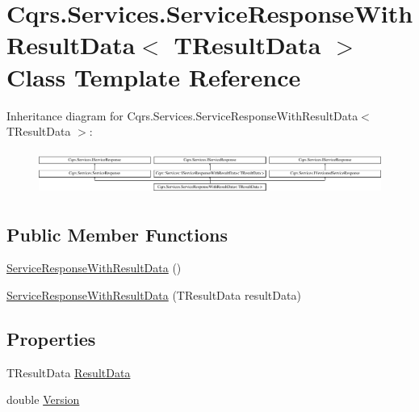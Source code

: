 \hypertarget{classCqrs_1_1Services_1_1ServiceResponseWithResultData}{}\section{Cqrs.\+Services.\+Service\+Response\+With\+Result\+Data$<$ T\+Result\+Data $>$ Class Template Reference}
\label{classCqrs_1_1Services_1_1ServiceResponseWithResultData}
Inheritance diagram for Cqrs.\+Services.\+Service\+Response\+With\+Result\+Data$<$ T\+Result\+Data $>$\+:\begin{figure}[H]
\begin{center}
\leavevmode
\includegraphics[height=1.454545cm]{classCqrs_1_1Services_1_1ServiceResponseWithResultData}
\end{center}
\end{figure}
\subsection*{Public Member Functions}
\begin{DoxyCompactItemize}
\item 
\hyperlink{classCqrs_1_1Services_1_1ServiceResponseWithResultData_a4241511df21804b73baec2b0c2e66402_a4241511df21804b73baec2b0c2e66402}{Service\+Response\+With\+Result\+Data} ()
\item 
\hyperlink{classCqrs_1_1Services_1_1ServiceResponseWithResultData_a63a840d449e8b06652130ffb1228432d_a63a840d449e8b06652130ffb1228432d}{Service\+Response\+With\+Result\+Data} (T\+Result\+Data result\+Data)
\end{DoxyCompactItemize}
\subsection*{Properties}
\begin{DoxyCompactItemize}
\item 
T\+Result\+Data \hyperlink{classCqrs_1_1Services_1_1ServiceResponseWithResultData_ab0768d40341eb667f362e5ddc8412810_ab0768d40341eb667f362e5ddc8412810}{Result\+Data}
\item 
double \hyperlink{classCqrs_1_1Services_1_1ServiceResponseWithResultData_aefdac5ce3816eac021c47f62272969cd_aefdac5ce3816eac021c47f62272969cd}{Version}
\end{DoxyCompactItemize}


